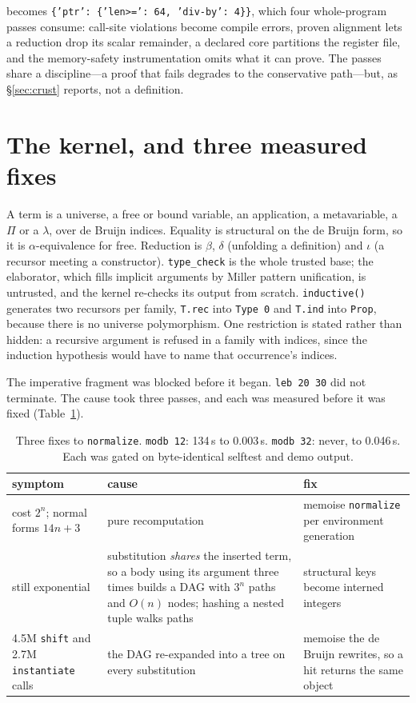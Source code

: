 \documentclass[11pt]{article}
\newcommand{\code}[1]{\texttt{#1}}
\begin{document}
becomes \code{\{'ptr': \{'len>=': 64, 'div-by': 4\}\}}, which four
whole-program passes consume: call-site violations become compile errors,
proven alignment lets a reduction drop its scalar remainder, a declared core
partitions the register file, and the memory-safety instrumentation omits what
it can prove. The passes share a discipline---a proof that fails degrades to
the conservative path---but, as \S\ref{sec:crust} reports, not a definition.

\section{The kernel, and three measured fixes}
\label{sec:kernel}

A term is a universe, a free or bound variable, an application, a
metavariable, a $\Pi$ or a $\lambda$, over de Bruijn indices. Equality is
structural on the de Bruijn form, so it is $\alpha$-equivalence for free.
Reduction is $\beta$, $\delta$ (unfolding a definition) and $\iota$ (a
recursor meeting a constructor). \code{type\_check} is the whole trusted base;
the elaborator, which fills implicit arguments by Miller pattern unification,
is untrusted, and the kernel re-checks its output from scratch.
\code{inductive()} generates two recursors per family, \code{T.rec} into
\code{Type 0} and \code{T.ind} into \code{Prop}, because there is no universe
polymorphism. One restriction is stated rather than hidden: a recursive
argument is refused in a family with indices, since the induction hypothesis
would have to name that occurrence's indices.

The imperative fragment was blocked before it began. \code{leb 20 30} did not
terminate. The cause took three passes, and each was measured before it was
fixed (Table~\ref{tab:kernel-perf}).

\begin{table}[h]
\centering
\small
\begin{tabular}{p{4.2cm} p{5.6cm} p{5.2cm}}
\toprule
symptom & cause & fix \\
\midrule
cost $2^n$; normal forms $14n+3$ &
pure recomputation &
memoise \code{normalize} per environment generation \\
still exponential &
substitution \emph{shares} the inserted term, so a body using its argument
three times builds a DAG with $3^n$ paths and $O(n)$ nodes; hashing a nested
tuple walks paths &
structural keys become interned integers \\
4.5M \code{shift} and 2.7M \code{instantiate} calls &
the DAG re-expanded into a tree on every substitution &
memoise the de Bruijn rewrites, so a hit returns the same object \\
\bottomrule
\end{tabular}
\caption{Three fixes to \code{normalize}. \code{modb 12}: 134\,s to 0.003\,s.
\code{modb 32}: never, to 0.046\,s. Each was gated on byte-identical selftest
and demo output.}
\label{tab:kernel-perf}
\end{table}
\end{document}
